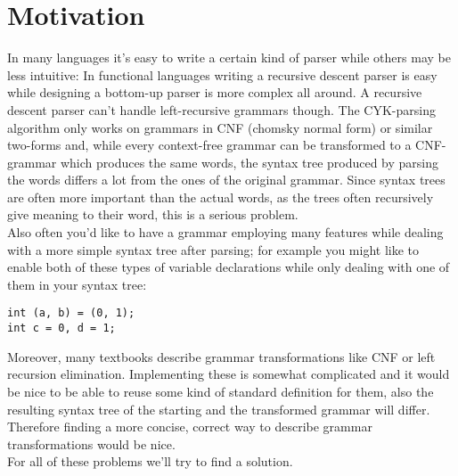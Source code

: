 \documentclass[a4paper]{article}
\begin{document}

\section*{Motivation}
In many languages it's easy to write a certain kind of parser while others may be less intuitive: In functional languages writing a recursive descent parser is easy while designing a bottom-up parser is more complex all around. A recursive descent parser can't handle left-recursive grammars though. The CYK-parsing algorithm only works on grammars in CNF (chomsky normal form) or similar two-forms \cite{cnfornotcnf} and, while every context-free grammar can be transformed to a CNF-grammar which produces the same words, the syntax tree produced by parsing the words differs a lot from the ones of the original grammar. Since syntax trees are often more important than the actual words, as the trees often recursively give meaning to their word, this is a serious problem.\\
Also often you'd like to have a grammar employing many features while dealing with a more simple syntax tree after parsing; for example you might like to enable both of these types of variable declarations while only dealing with one of them in your syntax tree:
\begin{verbatim}
int (a, b) = (0, 1);
int c = 0, d = 1;
\end{verbatim}
Moreover, many textbooks describe grammar transformations like CNF or left recursion elimination. Implementing these is somewhat complicated and it would be nice to be able to reuse some kind of standard definition for them, also the resulting syntax tree of the starting and the transformed grammar will differ. Therefore finding a more concise, correct way to describe grammar transformations would be nice.\\
For all of these problems we'll try to find a solution.
\end{document}

